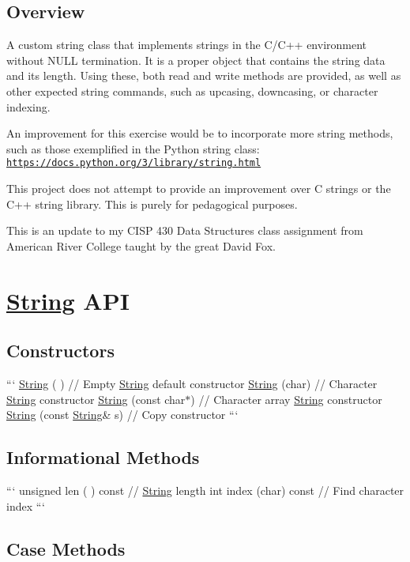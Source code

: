 \subsection*{Overview }

A custom string class that implements strings in the C/\-C++ environment without N\-U\-L\-L termination. It is a proper object that contains the string data and its length. Using these, both read and write methods are provided, as well as other expected string commands, such as upcasing, downcasing, or character indexing.

An improvement for this exercise would be to incorporate more string methods, such as those exemplified in the Python string class\-: \href{https://docs.python.org/3/library/string.html}{\tt https\-://docs.\-python.\-org/3/library/string.\-html}

This project does not attempt to provide an improvement over C strings or the C++ {\ttfamily string} library. This is purely for pedagogical purposes.

This is an update to my C\-I\-S\-P 430 Data Structures class assignment from American River College taught by the great David Fox.

\section*{\hyperlink{classString}{String} A\-P\-I }

\subsection*{Constructors }

``` \hyperlink{classString}{String} ( ) // Empty \hyperlink{classString}{String} default constructor \hyperlink{classString}{String} (char) // Character \hyperlink{classString}{String} constructor \hyperlink{classString}{String} (const char$\ast$) // Character array \hyperlink{classString}{String} constructor \hyperlink{classString}{String} (const \hyperlink{classString}{String}\& s) // Copy constructor ```

\subsection*{Informational Methods }

``` unsigned len ( ) const // \hyperlink{classString}{String} length int index (char) const // Find character index ```

\subsection*{Case Methods }

